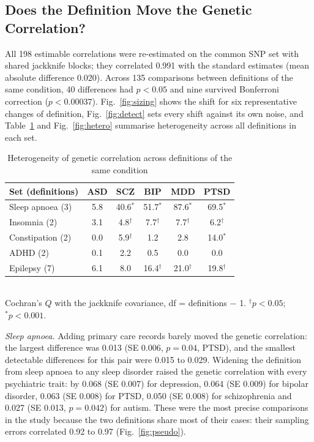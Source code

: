 \documentclass[conference]{IEEEtran}
\begin{document}
\subsection{Does the Definition Move the Genetic Correlation?}








All 198 estimable correlations were re-estimated on the common SNP set with shared jackknife blocks; they correlated 0.991 with the standard estimates (mean absolute difference 0.020). Across 135 comparisons between definitions of the same condition, 40 differences had $p < 0.05$ and nine survived Bonferroni correction ($p < 0.00037$). Fig.~\ref{fig:sizing} shows the shift for six representative changes of definition, Fig.~\ref{fig:detect} sets every shift against its own noise, and Table~\ref{tab:q} and Fig.~\ref{fig:hetero} summarise heterogeneity across all definitions in each set.

\begin{table}[t]
\caption{Heterogeneity of genetic correlation across definitions of the same condition}
\label{tab:q}
\centering
\small
\begin{tabular}{@{}lccccc@{}}
\toprule
Set (definitions) & ASD & SCZ & BIP & MDD & PTSD \\
\midrule
Sleep apnoea (3) & 5.8 & 40.6$^{\ast}$ & 51.7$^{\ast}$ & 87.6$^{\ast}$ & 69.5$^{\ast}$ \\
Insomnia (2) & 3.1 & 4.8$^{\dagger}$ & 7.7$^{\dagger}$ & 7.7$^{\dagger}$ & 6.2$^{\dagger}$ \\
Constipation (2) & 0.0 & 5.9$^{\dagger}$ & 1.2 & 2.8 & 14.0$^{\ast}$ \\
ADHD (2) & 0.1 & 2.2 & 0.5 & 0.0 & 0.0 \\
Epilepsy (7) & 6.1 & 8.0 & 16.4$^{\dagger}$ & 21.0$^{\dagger}$ & 19.8$^{\dagger}$ \\
\bottomrule
\end{tabular}
\\[2pt]
\footnotesize{Cochran's $Q$ with the jackknife covariance, df = definitions $-$ 1. $^{\dagger}p < 0.05$; $^{\ast}p < 0.001$.}
\end{table}









\emph{Sleep apnoea.} Adding primary care records barely moved the genetic correlation: the largest difference was 0.013 (SE 0.006, $p = 0.04$, PTSD), and the smallest detectable differences for this pair were 0.015 to 0.029. Widening the definition from sleep apnoea to any sleep disorder raised the genetic correlation with every psychiatric trait: by 0.068 (SE 0.007) for depression, 0.064 (SE 0.009) for bipolar disorder, 0.063 (SE 0.008) for PTSD, 0.050 (SE 0.008) for schizophrenia and 0.027 (SE 0.013, $p = 0.042$) for autism. These were the most precise comparisons in the study because the two definitions share most of their cases: their sampling errors correlated 0.92 to 0.97 (Fig.~\ref{fig:pseudo}).
\end{document}
